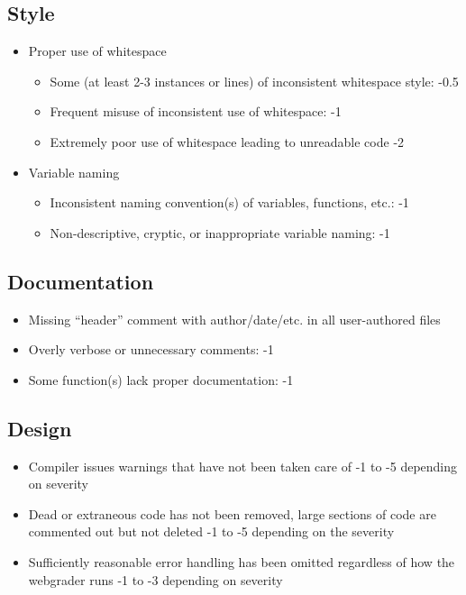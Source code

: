 \documentclass[12pt]{scrartcl}
\begin{document}
\subsection*{Style}

\begin{itemize}
  \item Proper use of whitespace
  \begin{itemize}
    \item Some (at least 2-3 instances or lines) of inconsistent whitespace style: -0.5
    \item Frequent misuse of inconsistent use of whitespace: -1 
    \item Extremely poor use of whitespace leading to unreadable code -2
  \end{itemize}
  \item Variable naming
  \begin{itemize}
    \item Inconsistent naming convention(s) of variables, functions, etc.: -1
    \item Non-descriptive, cryptic, or inappropriate variable naming: -1
  \end{itemize}
\end{itemize}

\subsection*{Documentation}

\begin{itemize}
  \item Missing ``header'' comment with author/date/etc. in all user-authored files
  \item Overly verbose or unnecessary comments: -1
  \item Some function(s) lack proper documentation: -1
\end{itemize}

\subsection*{Design}

\begin{itemize}
  \item Compiler issues warnings that have not been taken care of -1 to -5 depending on severity
  \item Dead or extraneous code has not been removed, large sections of code are commented out but not deleted -1 to -5 depending on the severity
  \item Sufficiently reasonable error handling has been omitted regardless of how the webgrader runs -1 to -3 depending on severity
\end{itemize}
\end{document}
